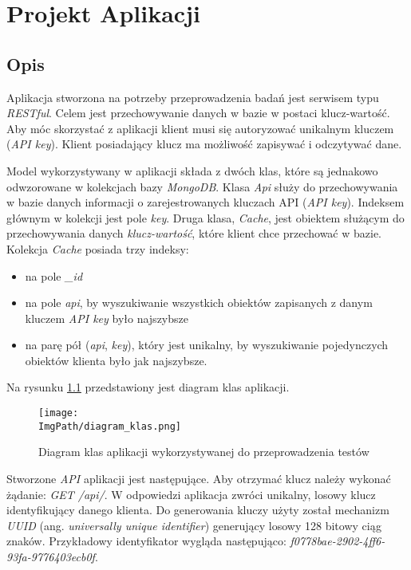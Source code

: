 \chapter{Projekt Aplikacji}
\section{Opis}
Aplikacja stworzona na potrzeby przeprowadzenia badań jest serwisem typu \textsl{RESTful}. Celem jest przechowywanie danych w bazie w postaci klucz-wartość. Aby móc skorzystać z aplikacji klient musi się autoryzować unikalnym kluczem (\textsl{API key}). Klient posiadający klucz ma możliwość zapisywać i odczytywać dane. 

Model wykorzystywany w aplikacji składa z dwóch klas, które są jednakowo odwzorowane w kolekcjach bazy \textsl{MongoDB}. Klasa \textsl{Api} służy do przechowywania w bazie danych informacji o zarejestrowanych kluczach API (\textsl{API key}). Indeksem głównym w kolekcji jest pole \textsl{key}.
Druga klasa, \textsl{Cache}, jest obiektem służącym do przechowywania danych \textsl{klucz-wartość}, które klient chce przechować w bazie. Kolekcja \textsl{Cache} posiada trzy indeksy:
\begin{itemize}
    \item na pole \textsl{\_id}
    \item na pole \textsl{api}, by wyszukiwanie wszystkich obiektów zapisanych z danym kluczem \textsl{API key} było najszybsze
    \item na parę pół (\textsl{api}, \textsl{key}), który jest unikalny, by wyszukiwanie pojedynczych obiektów klienta było jak najszybsze.
\end{itemize}
Na rysunku \ref{fig:class_diagram} przedstawiony jest diagram klas aplikacji. 
\begin{figure}[!ht]
\centering
\texttt{[image: \\ImgPath/diagram\_klas.png]}
\caption{Diagram klas aplikacji wykorzystywanej do przeprowadzenia testów}
\label{fig:class_diagram}
\end{figure}

Stworzone \textsl{API} aplikacji jest następujące. Aby otrzymać klucz należy wykonać żądanie: \textsl{GET /api/}. W odpowiedzi aplikacja zwróci unikalny, losowy klucz identyfikujący danego klienta. Do generowania kluczy użyty został mechanizm \textsl{UUID} (ang. \textsl{universally unique identifier}) generujący losowy 128 bitowy ciąg znaków. Przykładowy identyfikator wygląda następująco: \textsl{f0778bae-2902-4ff6-93fa-9776403ecb0f}.

